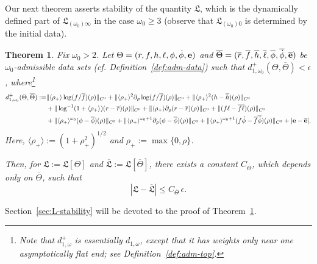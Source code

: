 \documentclass[10pt, reqno]{amsart}
\newtheorem{theorem}{Theorem}[section]
\theoremstyle{definition}
\theoremstyle{remark}
\theoremstyle{conjecture}
\numberwithin{equation}{section}
\newcommand{\nrm}[1]{\Vert#1\Vert}
\newcommand{\brk}[1]{\langle#1\rangle}
\newcommand{\set}[1]{\{#1\}}
\newcommand{\rd}{\partial}
\newcommand{\0}{\emptyset}
\newcommand{\eps}{\epsilon}
\newcommand{\Tht}{\Theta}
\newcommand{\omg}{\omega}
\newcommand{\bfe}{{\bf e}}
\newcommand{\e}{\bfe}							%
\newcommand{\phibg}{\overline{\phi}}				%
\newcommand{\rbg}{\overline{r}}					%
\newcommand{\ebg}{\overline{\e}}					%
\newcommand{\fbg}{\overline{f}}
\newcommand{\hbg}{\overline{h}}
\newcommand{\ellbg}{\overline{\ell}}
\newcommand{\dphibg}{\overline{\dot{\phi}}}
\newcommand{\Abs}[1]{\left\vert #1 \right\vert}
\begin{document}
Our next theorem asserts stability of the quantity $\mathfrak{L}$, which is the dynamically defined part of $\mathfrak{L}_{(\omg_{0}) \infty}$ in the case $\omg_{0} \geq 3$ (observe that $\mathfrak{L}_{(\omg_{0}) 0}$ is determined by the initial data). 
\begin{theorem} \label{thm:L-stability}
Fix $\omg_0>2$. Let $\Tht = (r, f, h, \ell, \phi, \dot{\phi}, \e)$ and $\overline{\Tht} = (\rbg, \fbg, \hbg, \ellbg, \phibg, \dphibg, \ebg)$ be $\omg_0$-admissible data sets (cf. Definition~\ref{def:adm-data}) such that $d_{1, \omg_0}^{+}(\Tht, \overline{\Tht}) < \eps$, where\footnote{Note that $d^{+}_{1, \omg}$ is essentially $d_{1,\omg}$, except that it has weights only near one asymptotically flat end; see Definition~\ref{def:adm-top}.}
\begin{equation*}
\begin{aligned}
	d_{1, \omg_0}^{+} (\Tht, \overline{\Tht}) := 
	& \nrm{\brk{\rho_{+}} \log (f / \fbg)(\rho)}_{C^{0}} 
	+ \nrm{\brk{\rho_{+}}^{2} \rd_{\rho} \log (f / \fbg)(\rho)}_{C^{0}} 
	+ \nrm{\brk{\rho_{+}}^{2}  (h - \hbg) (\rho)}_{C^{0}} \\
	& + \nrm{\log^{-1}(1+\brk{\rho_{+}}) (r - \rbg)(\rho)}_{C^{0}} 
	+ \nrm{\brk{\rho_{+}} \rd_{\rho} (r - \rbg)(\rho)}_{C^{0}} 
	+ \nrm{(f \ell - \fbg \ellbg)(\rho)}_{C^{0}}  \\
	& + \nrm{\brk{\rho_{+}}^{\omg_0} (\phi - \phibg)(\rho)}_{C^{0}} 
	+ \nrm{\brk{\rho_{+}}^{\omg_0+1} \rd_{\rho} (\phi- \phibg)(\rho)}_{C^{0}} 
	+ \nrm{\brk{\rho_{+}}^{\omg_0+1} (f \dot{\phi} - \fbg \dphibg)(\rho)}_{C^{0}}  + |{\bf e} - \ebg|.  
\end{aligned}
\end{equation*}
Here, $\brk{\rho_{+}} := (1 + \rho_{+}^{2})^{1/2}$ and $\rho_{+} := \max\set{0, \rho}$.

Then, for $\mathfrak L:=\mathfrak L[\Tht]$ and $\overline{\mathfrak L}:=\mathfrak L[\overline{\Tht}]$, there exists a constant $C_{\overline{\Tht}}$, which depends only on $\overline{\Tht}$, such that
\begin{equation*}
	\Abs{\mathfrak{L} - \overline{\mathfrak{L}}} \leq C_{\overline{\Tht}} \, \eps.
\end{equation*}
\end{theorem}
Section~\ref{sec:L-stability} will be devoted to the proof of Theorem~\ref{thm:L-stability}. 
\end{document}
